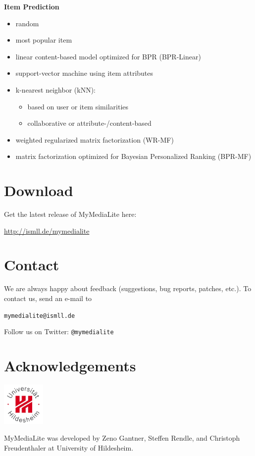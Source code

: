 \documentclass[a4paper, foldmark, 12pt]{leaflet}
\begin{document}
\textbf{Item Prediction}
\begin{itemize}
	\item random
	\item most popular item
	\item linear content-based model optimized for BPR (BPR-Linear)
	\item support-vector machine using item attributes
	\item k-nearest neighbor (kNN):
		\begin{itemize}
			\item based on user or item similarities
			\item collaborative or attribute-/content-based
		\end{itemize}
	\item weighted regularized matrix factorization (WR-MF)
	\item matrix factorization optimized for Bayesian Personalized Ranking (BPR-MF)
\end{itemize}

\newpage

\section{Download}
Get the latest release of MyMediaLite here:
\begin{center}
	\url{http://ismll.de/mymedialite}
\end{center}

\section{Contact}
We are always happy about feedback (suggestions, bug reports, patches, etc.).
To contact us, send an e-mail to
\begin{center}
	\texttt{mymedialite@ismll.de}
\end{center}

Follow us on Twitter: {\tt @mymedialite}

\section{Acknowledgements}

\begin{floatingfigure}[r]{1.6cm}
	\vspace{-0.5cm}
	\includegraphics[width=2.1cm]{fig/uni-hildesheim-400x400.jpg}
\end{floatingfigure}
MyMediaLite was developed by Zeno Gantner,
Steffen Rendle, and Christoph Freudenthaler
at University of Hildesheim.
	
\end{document}
